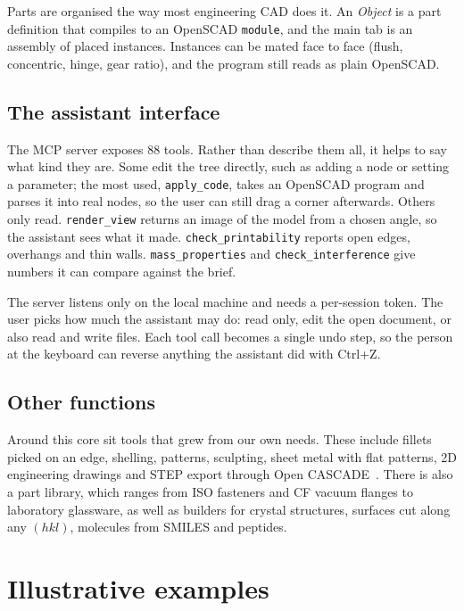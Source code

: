 \documentclass[preprint,12pt]{elsarticle}
\begin{document}
Parts are organised the way most engineering CAD does it. An \emph{Object} is a part definition that compiles to an OpenSCAD \texttt{module}, and the main tab is an assembly of placed instances. Instances can be mated face to face (flush, concentric, hinge, gear ratio), and the program still reads as plain OpenSCAD.

\subsection{The assistant interface}

The MCP server exposes 88 tools. Rather than describe them all, it helps to say what kind they are. Some edit the tree directly, such as adding a node or setting a parameter; the most used, \texttt{apply\_code}, takes an OpenSCAD program and parses it into real nodes, so the user can still drag a corner afterwards. Others only read. \texttt{render\_view} returns an image of the model from a chosen angle, so the assistant sees what it made. \texttt{check\_printability} reports open edges, overhangs and thin walls. \texttt{mass\_properties} and \texttt{check\_interference} give numbers it can compare against the brief.

The server listens only on the local machine and needs a per-session token. The user picks how much the assistant may do: read only, edit the open document, or also read and write files. Each tool call becomes a single undo step, so the person at the keyboard can reverse anything the assistant did with Ctrl+Z.

\subsection{Other functions}

Around this core sit tools that grew from our own needs. These include fillets picked on an edge, shelling, patterns, sculpting, sheet metal with flat patterns, 2D engineering drawings and STEP export through Open CASCADE~\cite{occt}. There is also a part library, which ranges from ISO fasteners and CF vacuum flanges to laboratory glassware, as well as builders for crystal structures, surfaces cut along any $(hkl)$, molecules from SMILES and peptides.

\section{Illustrative examples}
\end{document}
